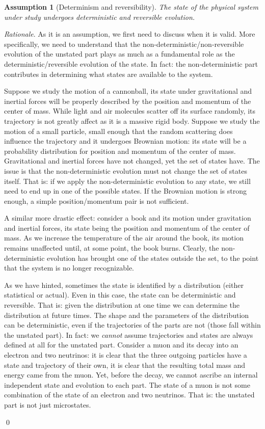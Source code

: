 \documentclass[aps,pra,10pt,twocolumn,floatfix,nofootinbib]{revtex4-1}
\newtheorem{assump}{Assumption}
\theoremstyle{definition}
\newenvironment{rationale}{\emph{Rationale}.}{\qed}
\begin{document}
\begin{assump}[Determinism and reversibility]\label{detrevass}
The state of the physical system under study undergoes deterministic and reversible evolution.
\end{assump}

\begin{rationale}
As it is an assumption, we first need to discuss when it is valid. More specifically, we need to understand that the non-deterministic/non-reversible evolution of the unstated part plays as much as a fundamental role as the deterministic/reversible evolution of the state. In fact: the non-deterministic part contributes in determining what states are available to the system.

Suppose we study the motion of a cannonball, its state under gravitational and inertial forces will be properly described by the position and momentum of the center of mass. While light and air molecules scatter off its surface randomly, its trajectory is not greatly affect as it is a massive rigid body. Suppose we study the motion of a small particle, small enough that the random scattering does influence the trajectory and it undergoes Brownian motion: its state will be a probability distribution for position and momentum of the center of mass. Gravitational and inertial forces have not changed, yet the set of states have. The issue is that the non-deterministic evolution must not change the set of states itself. That is: if we apply the non-deterministic evolution to any state, we still need to end up in one of the possible states. If the Brownian motion is strong enough, a simple position/momentum pair is not sufficient.

A similar more drastic effect: consider a book and its motion under gravitation and inertial forces, its state being the position and momentum of the center of mass. As we increase the temperature of the air around the book, its motion remains unaffected until, at some point, the book burns. Clearly, the non-deterministic evolution has brought one of the states outside the set, to the point that the system is no longer recognizable.

As we have hinted, sometimes the state is identified by a distribution (either statistical or actual). Even in this case, the state can be deterministic and reversible. That is: given the distribution at one time we can determine the distribution at future times. The shape and the parameters of the distribution can be deterministic, even if the trajectories of the parts are not (those fall within the unstated part). In fact: we \emph{cannot} assume trajectories and states are always defined at all for the unstated part. Consider a muon and its decay into an electron and two neutrinos: it is clear that the three outgoing particles have a state and trajectory of their own, it is clear that the resulting total mass and energy came from the muon. Yet, before the decay, we cannot ascribe an internal independent state and evolution to each part. The state of a muon is not some combination of the state of an electron and two neutrinos. That is: the unstated part is not just microstates.


\end{rationale}
\end{document}
